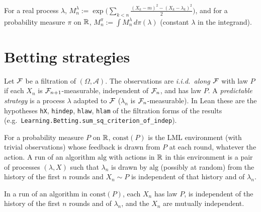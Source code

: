 \begin{definition}
  \label{def:subg_test}
  \leanok
  For a real process $\lambda$, $M^\lambda_n := \exp\big(\sum_{k<n} \frac{(X_k - m)^2 - (X_k -
  \lambda_k)^2}{2}\big)$, and for a probability measure $\pi$ on $\mathbb{R}$,
  $M^\pi_n := \int M^\lambda_n \, d\pi(\lambda)$ (constant $\lambda$ in the integrand).
\end{definition}

\section{Betting strategies}

\begin{definition}
  \label{def:predictable}
  \leanok
  Let $\mathcal{F}$ be a filtration of $(\Omega, \mathcal A)$. The observations are \emph{i.i.d.\ along
  $\mathcal{F}$} with law $P$ if each $X_n$ is $\mathcal{F}_{n+1}$-measurable, independent of $\mathcal{F}_n$, and has law
  $P$. A \emph{predictable strategy} is a process $\lambda$ adapted to $\mathcal{F}$ ($\lambda_n$ is
  $\mathcal{F}_n$-measurable). In Lean these are the hypotheses
  \texttt{hX}, \texttt{hindep}, \texttt{hlaw}, \texttt{hlam} of the filtration forms of the results
  (e.g.\ \texttt{Learning.Betting.sum\_sq\_criterion\_of\_indep}).
\end{definition}

\begin{definition}
  \label{def:iid_env}
  \leanok
  For a probability measure $P$ on $\mathbb{R}$, $\mathrm{const}(P)$ is the LML environment (with trivial
  observations) whose feedback is drawn from $P$ at each round, whatever the action. A run of an
  algorithm $\mathrm{alg}$ with actions in $\mathbb{R}$ in this environment is a pair of processes
  $(\lambda, X)$ such that $\lambda_n$ is drawn by $\mathrm{alg}$ (possibly at random) from the
  history of the first $n$ rounds and $X_n \sim P$ is independent of that history and of
  $\lambda_n$.
\end{definition}

\begin{lemma}
  \label{lem:iid_env_feedback}
  \leanok
  In a run of an algorithm in $\mathrm{const}(P)$, each $X_n$ has law $P$, is independent of the
  history of the first $n$ rounds and of $\lambda_n$, and the $X_n$ are mutually independent.
\end{lemma}

